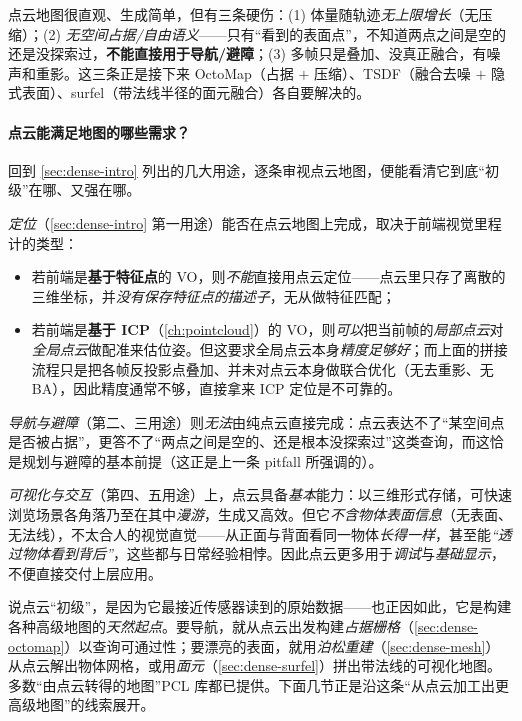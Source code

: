 \begin{pitfall}
点云地图很直观、生成简单，但有三条硬伤：(1) 体量随轨迹\emph{无上限增长}（无压缩）；(2) \emph{无空间占据/自由语义}——只有“看到的表面点”，不知道两点之间是空的还是没探索过，\textbf{不能直接用于导航/避障}；(3) 多帧只是叠加、没真正融合，有噪声和重影。这三条正是接下来 OctoMap（占据 $+$ 压缩）、TSDF（融合去噪 $+$ 隐式表面）、surfel（带法线半径的面元融合）各自要解决的。
\end{pitfall}

\paragraph{点云能满足地图的哪些需求？}
回到 \cref{sec:dense-intro} 列出的几大用途，逐条审视点云地图，便能看清它到底“初级”在哪、又强在哪。

\emph{定位}（\cref{sec:dense-intro} 第一用途）能否在点云地图上完成，取决于前端视觉里程计的类型：
\begin{itemize}
  \item 若前端是\textbf{基于特征点}的 VO，则\emph{不能}直接用点云定位——点云里只存了离散的三维坐标，并\emph{没有保存特征点的描述子}，无从做特征匹配；
  \item 若前端是\textbf{基于 ICP}（\cref{ch:pointcloud}）的 VO，则\emph{可以}把当前帧的\emph{局部点云}对\emph{全局点云}做配准来估位姿。但这要求全局点云本身\emph{精度足够好}；而上面的拼接流程只是把各帧反投影点叠加、并未对点云本身做联合优化（无去重影、无 BA），因此精度通常不够，直接拿来 ICP 定位是不可靠的。
\end{itemize}
\emph{导航与避障}（第二、三用途）则\emph{无法}由纯点云直接完成：点云表达不了“某空间点是否被占据”，更答不了“两点之间是空的、还是根本没探索过”这类查询，而这恰是规划与避障的基本前提（这正是上一条 pitfall 所强调的）。

\emph{可视化与交互}（第四、五用途）上，点云具备\emph{基本}能力：以三维形式存储，可快速浏览场景各角落乃至在其中\emph{漫游}，生成又高效。但它\emph{不含物体表面信息}（无表面、无法线），不太合人的视觉直觉——从正面与背面看同一物体\emph{长得一样}，甚至能\emph{“透过物体看到背后”}，这些都与日常经验相悖。因此点云更多用于\emph{调试}与\emph{基础显示}，不便直接交付上层应用。

\begin{insight}[点云是一切高级地图的出发点]
说点云“初级”，是因为它最接近传感器读到的原始数据——也正因如此，它是构建各种高级地图的\emph{天然起点}。要导航，就从点云出发构建\emph{占据栅格}（\cref{sec:dense-octomap}）以查询可通过性；要漂亮的表面，就用\emph{泊松重建}（\cref{sec:dense-mesh}）从点云解出物体网格，或用\emph{面元}（\cref{sec:dense-surfel}）拼出带法线的可视化地图。多数“由点云转得的地图”PCL 库都已提供\cite{rusu2011pcl}。下面几节正是沿这条“从点云加工出更高级地图”的线索展开。
\end{insight}

